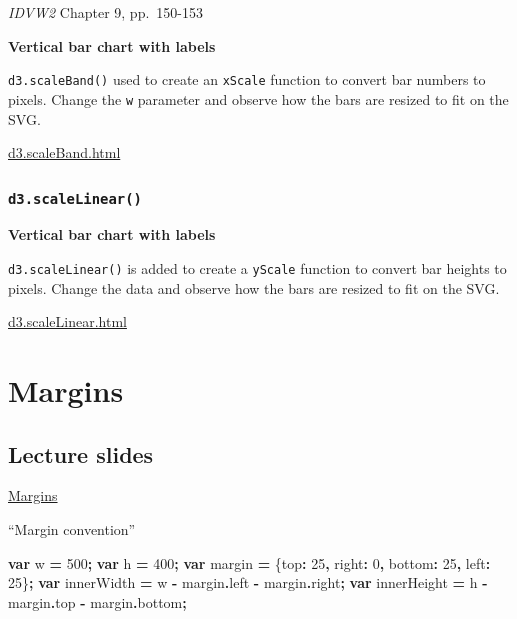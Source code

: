 \documentclass[
  openany]{book}
\newenvironment{Shaded}{\begin{snugshade}}{\end{snugshade}}
\newcommand{\AttributeTok}[1]{\textcolor[rgb]{0.77,0.63,0.00}{#1}}
\newcommand{\DataTypeTok}[1]{\textcolor[rgb]{0.13,0.29,0.53}{#1}}
\newcommand{\DecValTok}[1]{\textcolor[rgb]{0.00,0.00,0.81}{#1}}
\newcommand{\KeywordTok}[1]{\textcolor[rgb]{0.13,0.29,0.53}{\textbf{#1}}}
\newcommand{\NormalTok}[1]{#1}
\newcommand{\OperatorTok}[1]{\textcolor[rgb]{0.81,0.36,0.00}{\textbf{#1}}}
\begin{document}
\emph{IDVW2} Chapter 9, pp.~150-153

\textbf{Vertical bar chart with labels}

\texttt{d3.scaleBand()} used to create an \texttt{xScale} function to convert bar numbers to pixels. Change the \texttt{w} parameter and observe how the bars are resized to fit on the SVG.

\href{code/d3.scaleBand.html}{d3.scaleBand.html}

\hypertarget{d3.scalelinear}{%
\subsubsection*{\texorpdfstring{\texttt{d3.scaleLinear()}}{d3.scaleLinear()}}\label{d3.scalelinear}}

\textbf{Vertical bar chart with labels}

\texttt{d3.scaleLinear()} is added to create a \texttt{yScale} function to convert bar heights to pixels. Change the data and observe how the bars are resized to fit on the SVG.

\href{code/d3.scaleLinear.html}{d3.scaleLinear.html}

\hypertarget{margins}{%
\section{Margins}\label{margins}}

\hypertarget{lecture-slides-2}{%
\subsection{\texorpdfstring{Lecture slides }{Lecture slides }}\label{lecture-slides-2}}

\href{pdfs/margins.pdf}{Margins}

``Margin convention''

\begin{Shaded}
\begin{Highlighting}[]
  \KeywordTok{var}\NormalTok{ w }\OperatorTok{=} \DecValTok{500}\OperatorTok{;}
  \KeywordTok{var}\NormalTok{ h }\OperatorTok{=} \DecValTok{400}\OperatorTok{;}
  \KeywordTok{var}\NormalTok{ margin }\OperatorTok{=}\NormalTok{ \{}\DataTypeTok{top}\OperatorTok{:} \DecValTok{25}\OperatorTok{,} \DataTypeTok{right}\OperatorTok{:} \DecValTok{0}\OperatorTok{,} \DataTypeTok{bottom}\OperatorTok{:} \DecValTok{25}\OperatorTok{,} \DataTypeTok{left}\OperatorTok{:} \DecValTok{25}\NormalTok{\}}\OperatorTok{;}
  \KeywordTok{var}\NormalTok{ innerWidth }\OperatorTok{=}\NormalTok{ w }\OperatorTok{{-}}\NormalTok{ margin}\OperatorTok{.}\AttributeTok{left} \OperatorTok{{-}}\NormalTok{ margin}\OperatorTok{.}\AttributeTok{right}\OperatorTok{;}
  \KeywordTok{var}\NormalTok{ innerHeight }\OperatorTok{=}\NormalTok{ h }\OperatorTok{{-}}\NormalTok{ margin}\OperatorTok{.}\AttributeTok{top} \OperatorTok{{-}}\NormalTok{ margin}\OperatorTok{.}\AttributeTok{bottom}\OperatorTok{;}
\end{Highlighting}
\end{Shaded}
\end{document}
